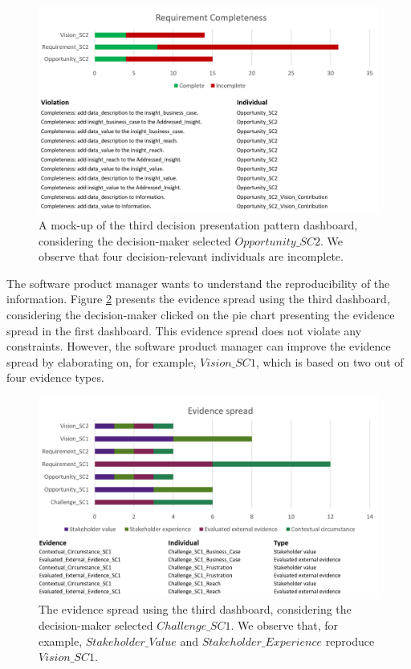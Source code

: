\begin{figure}[H]
\centering
  \includegraphics[width=16cm]{../../Images/05_Validation/05_RP_Dashboard_Component_3_RP_SC1_Completeness.png}
  \caption{A mock-up of the third decision presentation pattern dashboard, considering the decision-maker selected $Opportunity\_SC2$. We observe that four decision-relevant individuals are incomplete.}
  \label{fig:05_RP_Dashboard_Component_3_RP_SC1_Completeness}
\end{figure}

The software product manager wants to understand the reproducibility of the information. Figure \ref{fig:05_RP_Dashboard_Component_3_RP_SC1_Spread} presents the evidence spread using the third dashboard, considering the decision-maker clicked on the pie chart presenting the evidence spread in the first dashboard. This evidence spread does not violate any constraints. However, the software product manager can improve the evidence spread by elaborating on, for example, $Vision\_SC1$, which is based on two out of four evidence types.

\begin{figure}[H]
\centering
  \includegraphics[width=16cm]{../../Images/05_Validation/05_RP_Dashboard_Component_3_RP_SC1_Spread.png}
  \caption{The evidence spread using the third dashboard, considering the decision-maker selected $Challenge\_SC1$. We observe that, for example, $Stakeholder\_Value$ and $Stakeholder\_Experience$ reproduce $Vision\_SC1$.}
  \label{fig:05_RP_Dashboard_Component_3_RP_SC1_Spread}
\end{figure}

